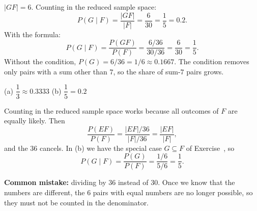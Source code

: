 \begin{solution}
	$|GF|=6$. Counting in the reduced sample space:
	\[ P(G\mid F)=\frac{|GF|}{|F|}=\frac{6}{30}=\frac15=0.2. \]
	With the formula:
	\[ P(G\mid F)=\frac{P(GF)}{P(F)}=\frac{6/36}{30/36}=\frac{6}{30}=\frac15. \]
	Without the condition, $P(G)=6/36=1/6\approx0.1667$. The condition removes
	only pairs with a sum other than $7$, so the share of sum-$7$ pairs grows.
	\begin{answer}
		(a) $\dfrac13\approx0.3333$ \quad (b) $\dfrac15=0.2$
	\end{answer}
	\begin{remark}
		Counting in the reduced sample space works because all outcomes of $F$
		are equally likely. Then
		\[ \frac{P(EF)}{P(F)}=\frac{|EF|/36}{|F|/36}=\frac{|EF|}{|F|}, \]
		and the $36$ cancels. In (b) we have the special case $G\subseteq F$ of
		Exercise~, so
		\[ P(G\mid F)=\frac{P(G)}{P(F)}=\frac{1/6}{5/6}=\frac15. \]

		\textbf{Common mistake:} dividing by $36$ instead of $30$. Once we know
		that the numbers are different, the $6$ pairs with equal numbers are
		no longer possible, so they must not be counted in the denominator.
	\end{remark}
\end{solution}
